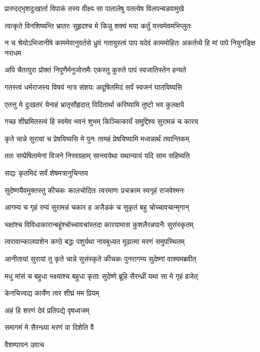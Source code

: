 \twolineshloka
{प्रारुदद्भृशदुःखार्ता विपाकं तस्य वीक्ष्य सा}
{पातालेषु पतत्येष विलपन्बडवामुखे}


\twolineshloka
{त्वत्कृते विनशिष्यन्ति भ्रातरः सुहृदश्च मे}
{किन्नु शक्यं मया कर्तुं यत्त्वमेवमभिप्लुतः}


\threelineshloka
{न च श्रेयोऽभिजानीषे काममेवानुवर्तसे}
{ध्रुवं गतायुस्त्वं पाप यदेवं काममोहितः}
{अकर्तव्ये हि मां पापे नियुनङ्क्षि नराधम}


\twolineshloka
{अपि चैतत्पुरा प्रोक्तं निपुणैर्मनुजोत्तमैः}
{एकस्तु कुरुते पापं स्वजातिस्तेन हन्यते}


\twolineshloka
{गतस्त्वं धर्मराजस्य विषयं नात्र संशयः}
{अदूषितमिदं सर्वं स्वजनं घातयिष्यसि}


\twolineshloka
{एतत्तु मे दुःखतरं येनाहं भ्रातृसौहृदात्}
{विदितार्था करिष्यामि तुष्टो भव कुलक्षये}


\twolineshloka
{गच्छ शीघ्रमितस्त्वं हि स्वमेव भवनं शुभम्}
{किञ्चित्कार्यं समुद्दिश्य सुरामन्नं च कारय}


\twolineshloka
{कृते चान्ने सुरायां च प्रेषयिष्यसि मे पुनः}
{तामहं प्रेषयिष्यामि मध्वन्नार्थं तवान्तिकम्}


\twolineshloka
{ततः सम्प्रेषितामेनां विजने निरवग्रहाम्}
{सान्त्वयेथा यथान्यायं यदि साम सहिष्यति}


\onelineshloka
{सद्यः कृतमिदं सर्वं शेषमत्रानुचिन्तय}



\twolineshloka
{सुदेष्णयैवमुक्तस्तु कीचकः कालचोदितः}
{त्वरमाणः प्रचक्राम स्वगृहं राजवेश्मनः}


\twolineshloka
{आगम्य च गृहं रम्यं सुरामन्नं चकार ह}
{अजैडकं च सुकृतं बहु चोच्चावचान्मृगान्}


\twolineshloka
{भक्षांश्च विविधाकारान्बहूंश्चोच्चावचांस्तदा}
{कारयामास कुशलैरन्नपानैः सुसंस्कृतम्}


\twolineshloka
{त्वरावान्कालपाशेन कण्ठे बद्धः पशुर्यथा}
{नावबुध्यत मूढात्मा मरणं समुपस्थितम्}


\twolineshloka
{आनीतायां सुरायां तु कृते चान्ने सुसंस्कृते}
{कीचकः पुनरागम्य सुदेष्णां वाक्यमब्रवीत्}


\twolineshloka
{मधु मांसं च बहुधा भक्ष्याश्च बहुधा कृताः}
{सुदेष्णे ब्रूहि सैरन्ध्रीं यथा सा मे गृहं व्रजेत्}


\onelineshloka
{केनचित्त्वद्य कार्येण त्वर शीघ्रं मम प्रियम्}

अहं हि शरणं देवं प्रतिपद्ये वृषध्वजम्

समागमं मे सैरन्ध्र्या मरणं वा दिशेति वै

वैशम्पायन उवाच


